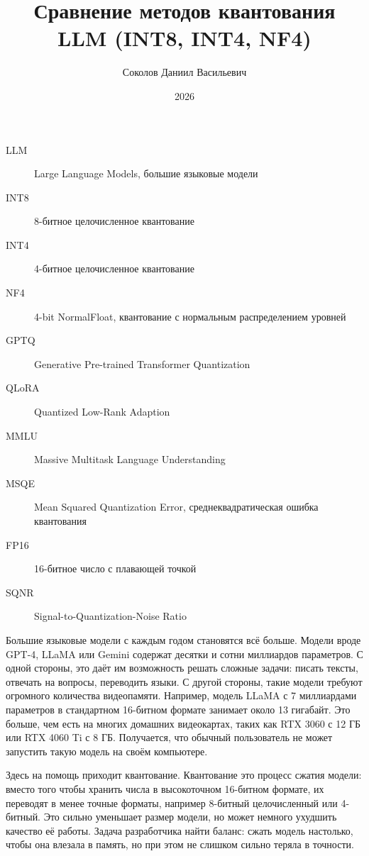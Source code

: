 \documentclass[bachelor, och, coursework]{SCWorks}
\begin{document}
	
	\title{Сравнение методов квантования LLM (INT8, INT4, NF4)}
	\author{Соколов Даниил Васильевич}
	\date{2026}
	
	\maketitle
	\tableofcontents
	
	\abbreviations
	\begin{description}
		\item[LLM] Large Language Models, большие языковые модели
		\item[INT8] 8-битное целочисленное квантование
		\item[INT4] 4-битное целочисленное квантование
		\item[NF4] 4-bit NormalFloat, квантование с нормальным распределением уровней
		\item[GPTQ] Generative Pre-trained Transformer Quantization
		\item[QLoRA] Quantized Low-Rank Adaption
		\item[MMLU] Massive Multitask Language Understanding
		\item[MSQE] Mean Squared Quantization Error, среднеквадратическая ошибка квантования
		\item[FP16] 16-битное число с плавающей точкой
		\item[SQNR] Signal-to-Quantization-Noise Ratio
	\end{description}
	
	\intro
	
	Большие языковые модели с каждым годом становятся всё больше. Модели вроде GPT-4, LLaMA или Gemini содержат десятки и сотни миллиардов параметров. С одной стороны, это даёт им возможность решать сложные задачи: писать тексты, отвечать на вопросы, переводить языки. С другой стороны, такие модели требуют огромного количества видеопамяти. Например, модель LLaMA с 7 миллиардами параметров в стандартном 16-битном формате занимает около 13 гигабайт. Это больше, чем есть на многих домашних видеокартах, таких как RTX 3060 с 12 ГБ или RTX 4060 Ti с 8 ГБ. Получается, что обычный пользователь не может запустить такую модель на своём компьютере.
	
	Здесь на помощь приходит квантование. Квантование это процесс сжатия модели: вместо того чтобы хранить числа в высокоточном 16-битном формате, их переводят в менее точные форматы, например 8-битный целочисленный или 4-битный. Это сильно уменьшает размер модели, но может немного ухудшить качество её работы. Задача разработчика найти баланс: сжать модель настолько, чтобы она влезала в память, но при этом не слишком сильно теряла в точности.
	
\end{document}
